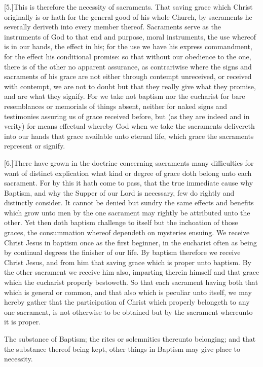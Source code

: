 [5.]This is therefore the necessity of sacraments. That saving grace which Christ originally is or hath for the general good of his whole Church, by sacraments he severally deriveth into every member thereof. Sacraments serve as the instruments of God to that end and purpose, moral instruments, the use whereof is in our hands, the effect in his; for the use we have his express commandment, for the effect his conditional promise: so that without our obedience to the one, there is of the other no apparent assurance, as contrariwise where the signs and sacraments of his grace are not either through contempt unreceived, or received with contempt, we are not to doubt but that they really give what they promise, and are what they signify. For we take not baptism nor the eucharist for bare resemblances or memorials of things absent, neither for naked signs and testimonies assuring us of grace received before, but (as they are indeed and in verity) for means effectual whereby God when we take the sacraments delivereth into our hands that grace available unto eternal life, which grace the sacraments represent or signify.

[6.]There have grown in the doctrine concerning sacraments many difficulties for want of distinct explication what kind or degree of grace doth belong unto each sacrament. For by  this it hath come to pass, that the true immediate cause why Baptism, and why the Supper of our Lord is necessary, few do rightly and distinctly consider.
 It cannot be denied but sundry the same effects and benefits which grow unto men by the one sacrament may rightly be attributed unto the other. Yet then doth baptism challenge to itself but the inchoation of those graces, the consummation whereof dependeth on mysteries ensuing. We receive Christ Jesus in baptism once as the first beginner, in the eucharist often as being by continual degrees the finisher of our life. By baptism therefore we receive Christ Jesus, and from him that saving grace which is proper unto baptism. By the other sacrament we receive him also, imparting therein himself and that grace which the eucharist properly bestoweth. So that each sacrament having both that which is general or common, and that also which is peculiar unto itself, we may hereby gather that the participation of Christ which properly belongeth to any one sacrament, is not otherwise to be obtained but by the sacrament whereunto it is proper.


The substance of Baptism; the rites or solemnities thereunto belonging; and that the substance thereof being kept, other things in Baptism may give place to necessity.
